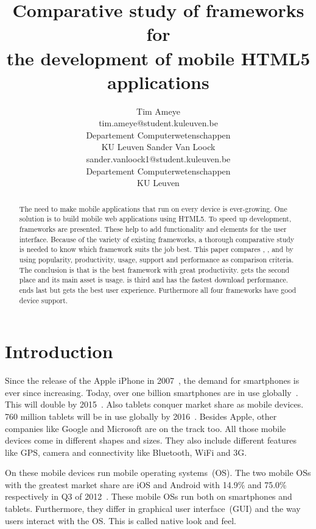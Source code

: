 \documentclass[a4paper]{artikel3}
\title{Comparative study of frameworks for \\ the development of mobile HTML5 applications}
\author{Tim Ameye \\ tim.ameye@student.kuleuven.be \\ Departement Computerwetenschappen \\ KU Leuven \And Sander Van Loock \\ sander.vanloock1@student.kuleuven.be \\ Departement Computerwetenschappen \\ KU Leuven}
\begin{document}
\maketitle

\begin{abstract}
The need to make mobile applications that run on every device is ever-growing.
One solution is to build mobile web applications using HTML5.
To speed up development,  frameworks are presented.
These help to add functionality and elements for the user interface.
Because of the variety of existing frameworks, a thorough comparative study is needed to know which framework suits the job best.
This paper compares \st{}, \jqm{}, \kendo{} and \lungo{} by using popularity, productivity, usage, support and performance as comparison criteria. 
The conclusion is that \jqm{} is the best framework with great productivity. 
\kendo{} gets the second place and its main asset is usage.
\lungo{} is third and has the fastest download performance.
\st{} ends last but gets the best user experience.
Furthermore all four frameworks have good device support.
\end{abstract}


\section{Introduction} %
\label{sec:introduction}
Since the release of the Apple iPhone in 2007~\cite{David2011}, the demand for smartphones is ever since increasing. 
Today, over one billion smartphones are in use globally~\cite{Yang2012}.
This will double by 2015~\cite{Gillett2012}.
Also tablets conquer market share as mobile devices.
760 million tablets will be in use globally by 2016~\cite{Gillett2012}.
Besides Apple, other companies like Google and Microsoft are on the track too.
All those mobile devices come in different shapes and sizes.
They also include different features like GPS, camera and connectivity like Bluetooth, WiFi and 3G.

On these mobile devices run mobile operating systems~(OS). 
The two mobile OSs with the greatest market share are iOS and Android with 14.9\% and 75.0\% respectively in Q3 of 2012~\cite{Protalinski2012}.
These mobile OSs run both on smartphones and tablets.
Furthermore, they differ in graphical user interface~(GUI) and the way users interact with the OS.
This is called native look and feel.
\end{document}
